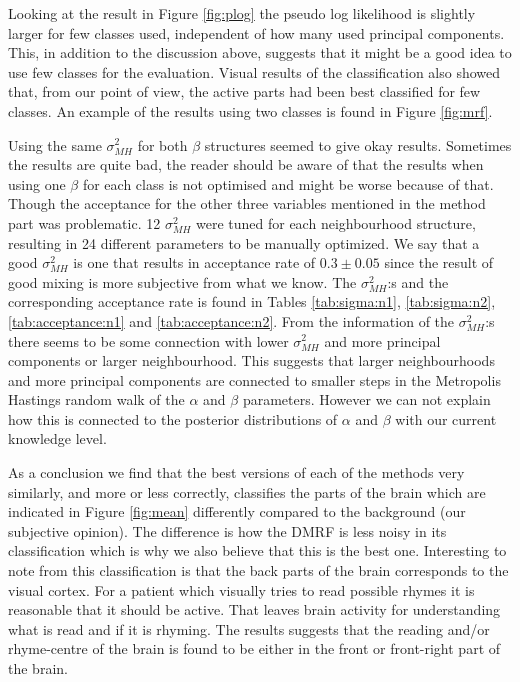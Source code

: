 \documentclass[a4paper,english]{article}
\begin{document}
Looking at the result in Figure \ref{fig:plog} the pseudo log likelihood is slightly larger for few classes used, independent of how many used principal components. This, in addition to the discussion above, suggests that it might be a good idea to use few classes for the evaluation. Visual results of the classification also showed that, from our point of view, the active parts had been best classified for few classes. An example of the results using two classes is found in Figure \ref{fig:mrf}.

Using the same $\sigma_{MH}^2$ for both $\beta$ structures seemed to give okay results. Sometimes the results are quite bad, the reader should be aware of that the results when using one $\beta$ for each class is not optimised and might be worse because of that. Though the acceptance for the other three variables mentioned in the method part was problematic. 12 $\sigma_{MH}^2$ were tuned for each neighbourhood structure, resulting in 24 different parameters to be manually optimized.
We say that a good $\sigma_{MH}^2$ is one that results in acceptance rate of $0.3 \pm 0.05$ since the result of good mixing is more subjective from what we know.
The $\sigma_{MH}^2$:s and the corresponding acceptance rate is found in Tables \ref{tab:sigma:n1}, \ref{tab:sigma:n2}, \ref{tab:acceptance:n1} and \ref{tab:acceptance:n2}.
From the information of the $\sigma_{MH}^2$:s there seems to be some connection with lower $\sigma_{MH}^2$ and more principal components or larger neighbourhood.
This suggests that larger neighbourhoods and more principal components are connected to smaller steps in the Metropolis Hastings random walk of the $\alpha$ and $\beta$ parameters.
However we can not explain how this is connected to the posterior distributions of $\alpha$ and $\beta$ with our current knowledge level.

As a conclusion we find that the best versions of each of the methods very similarly, and more or less correctly, classifies the parts of the brain which are indicated in Figure \ref{fig:mean} differently compared to the background (our subjective opinion).
The difference is how the DMRF is less noisy in its classification which is why we also believe that this is the best one.
Interesting to note from this classification is that the back parts of the brain corresponds to the visual cortex.
For a patient which visually tries to read possible rhymes it is reasonable that it should be active.
That leaves brain activity for understanding what is read and if it is rhyming.
The results suggests that the reading and/or rhyme-centre of the brain is found to be either in the front or front-right part of the brain.
\end{document}
